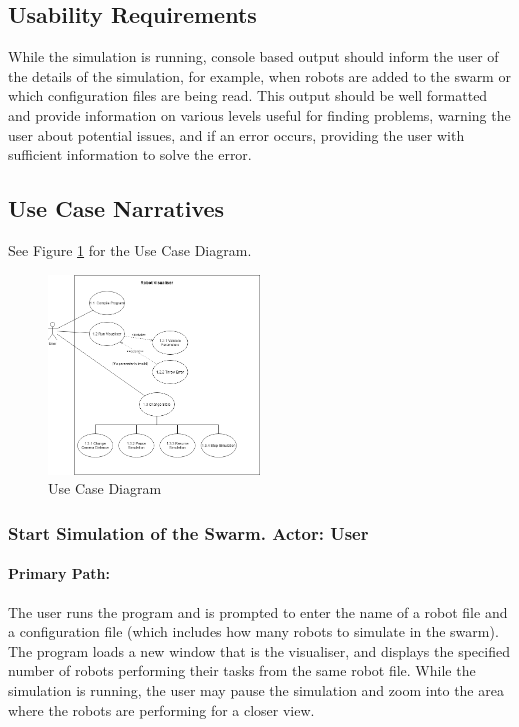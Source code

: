 \documentclass[11pt,a4paper]{article}
\begin{document}
\subsection{Usability Requirements}
While the simulation is running, console based output should inform the user of
the details of the simulation, for example, when robots are added to the swarm
or which configuration files are being read. This output should be well
formatted and provide information on various levels useful for finding
problems, warning the user about potential issues, and if an error occurs,
providing the user with sufficient information to solve the error.


\subsection{Use Case Narratives}
See Figure \ref{fig:use-case-diagram} for the Use Case Diagram.
\begin{figure}[htpb]
    \centering
    \includegraphics[width=0.5\textwidth]{2}
    \caption{Use Case Diagram}
    \label{fig:use-case-diagram}
\end{figure}
\subsubsection{Start Simulation of the Swarm. Actor: User}
\paragraph{Primary Path:} The user runs the program and is prompted to enter
the name of a robot file and a configuration file (which includes how many
robots to simulate in the swarm).  The program loads a new window that is the
visualiser, and displays the specified number of robots performing their tasks
from the same robot file.  While the simulation is running, the user may pause
the simulation and zoom into the area where the robots are performing for a
closer view.
\end{document}
